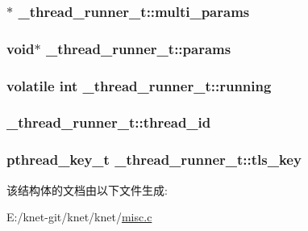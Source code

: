 \subsubsection[{multi\+\_\+params}]{$\ast$ \+\_\+thread\+\_\+runner\+\_\+t\+::multi\+\_\+params}\label{a00036_af21668f1d89dff5046d431399d2cf7c6_af21668f1d89dff5046d431399d2cf7c6}
\hypertarget{a00036_aab08f4e0fa5f6ffe16fcd3c055666c9c_aab08f4e0fa5f6ffe16fcd3c055666c9c}{}
\subsubsection[{params}]{\setlength{\rightskip}{0pt plus 5cm}void$\ast$ \+\_\+thread\+\_\+runner\+\_\+t\+::params}\label{a00036_aab08f4e0fa5f6ffe16fcd3c055666c9c_aab08f4e0fa5f6ffe16fcd3c055666c9c}
\hypertarget{a00036_a158d37a73657b2df73e3a2dd383808f8_a158d37a73657b2df73e3a2dd383808f8}{}
\subsubsection[{running}]{\setlength{\rightskip}{0pt plus 5cm}volatile int \+\_\+thread\+\_\+runner\+\_\+t\+::running}\label{a00036_a158d37a73657b2df73e3a2dd383808f8_a158d37a73657b2df73e3a2dd383808f8}
\hypertarget{a00036_ab632944b59861e33a9473347b0afdc00_ab632944b59861e33a9473347b0afdc00}{}
\subsubsection[{thread\+\_\+id}]{ \+\_\+thread\+\_\+runner\+\_\+t\+::thread\+\_\+id}\label{a00036_ab632944b59861e33a9473347b0afdc00_ab632944b59861e33a9473347b0afdc00}
\hypertarget{a00036_ad7461a4eef9b83e07f0acd4f26923744_ad7461a4eef9b83e07f0acd4f26923744}{}
\subsubsection[{tls\+\_\+key}]{\setlength{\rightskip}{0pt plus 5cm}pthread\+\_\+key\+\_\+t \+\_\+thread\+\_\+runner\+\_\+t\+::tls\+\_\+key}\label{a00036_ad7461a4eef9b83e07f0acd4f26923744_ad7461a4eef9b83e07f0acd4f26923744}


该结构体的文档由以下文件生成\+:\begin{DoxyCompactItemize}
\item 
E\+:/knet-\/git/knet/knet/\hyperlink{a00082}{misc.\+c}\end{DoxyCompactItemize}
